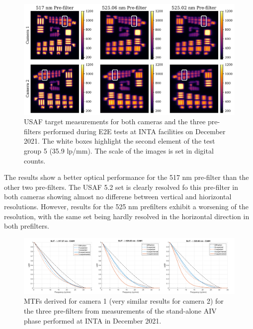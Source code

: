 \begin{figure}[t]
    \includegraphics[width=\textwidth]{figures/TuMag/USAF_E2E.pdf}
    \caption{
      USAF target measurements for both cameras and the three pre-filters performed during E2E tests at INTA facilities on December 2021. The white boxes highlight the second element of the test group 5 (35.9 lp/mm). The scale of the images is set in digital counts.}
      \label{tumag : USAF}
\end{figure}

The results show a better optical performance for the 517 nm pre-filter than the other two pre-filters. The USAF 5.2 set is clearly resolved fo this pre-filter in both cameras showing almost no differene between vertical and hiorizontal resolutions. However, results for the 525 nm prefilters exhibit a worsening of the resolution, with the same set being hardly resolved in the horizontal direction in both prefilters. 

\begin{figure}[t]
    \includegraphics[width=\textwidth]{figures/TuMag/mtfs.pdf}
    \caption{MTFs derived for camera 1 (very similar results for camera 2) for the three pre-filters from measurements of the stand-alone AIV phase performed at INTA in December 2021.  
      \label{fig_tumag:mtfs}}
\end{figure}



